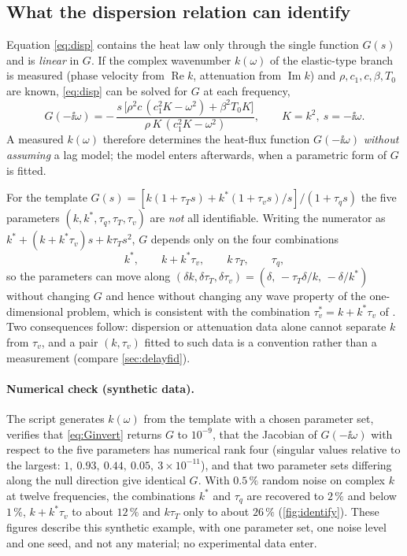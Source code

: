 \subsection{What the dispersion relation can identify}\label{sec:identify}
Equation \eqref{eq:disp} contains the heat law only through the single function $G(s)$ and is \emph{linear} in $G$. If the complex wavenumber $k(\omega)$ of the elastic-type branch is measured (phase velocity from $\operatorname{Re}k$, attenuation from $\operatorname{Im}k$) and $\rho,c_1,c,\beta,T_0$ are known, \eqref{eq:disp} can be solved for $G$ at each frequency,
\begin{equation}
G(-\ii\omega)=-\,\frac{s\,\bigl[\rho^2c\,(c_1^2K-\omega^2)+\beta^2T_0K\bigr]}{\rho\,K\,(c_1^2K-\omega^2)},\qquad K=k^2,\ s=-\ii\omega .\label{eq:Ginvert}
\end{equation}
A measured $k(\omega)$ therefore determines the heat-flux function $G(-\ii\omega)$ \emph{without assuming} a lag model; the model enters afterwards, when a parametric form of $G$ is fitted.

For the template $G(s)=[k(1+\tau_Ts)+k^*(1+\tau_vs)/s]/(1+\tau_qs)$ the five parameters $(k,k^*,\tau_q,\tau_T,\tau_v)$ are \emph{not} all identifiable. Writing the numerator as $k^*+(k+k^*\tau_v)s+k\tau_Ts^2$, $G$ depends only on the four combinations
\begin{equation}
k^*,\qquad k+k^*\tau_v,\qquad k\,\tau_T,\qquad \tau_q ,
\end{equation}
so the parameters can move along $(\delta k,\delta\tau_T,\delta\tau_v)=(\delta,\,-\tau_T\delta/k,\,-\delta/k^*)$ without changing $G$ and hence without changing any wave property of the one-dimensional problem, which is consistent with the combination $\tau_v^{*}=k+k^*\tau_v$ of \citet{RoyChoudhuri2007}. Two consequences follow: dispersion or attenuation data alone cannot separate $k$ from $\tau_v$, and a pair $(k,\tau_v)$ fitted to such data is a convention rather than a measurement (compare \cref{sec:delayfid}).

\paragraph{Numerical check (synthetic data).} The script  generates $k(\omega)$ from the template with a chosen parameter set, verifies that \eqref{eq:Ginvert} returns $G$ to $10^{-9}$, that the Jacobian of $G(-\ii\omega)$ with respect to the five parameters has numerical rank four (singular values relative to the largest: $1,\ 0.93,\ 0.44,\ 0.05,\ 3\times10^{-11}$), and that two parameter sets differing along the null direction give identical $G$. With $0.5\,\%$ random noise on complex $k$ at twelve frequencies, the combinations $k^*$ and $\tau_q$ are recovered to $2\,\%$ and below $1\,\%$, $k+k^*\tau_v$ to about $12\,\%$ and $k\tau_T$ only to about $26\,\%$ (\cref{fig:identify}). These figures describe this synthetic example, with one parameter set, one noise level and one seed, and not any material; no experimental data enter.

